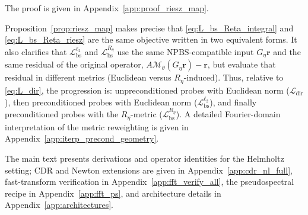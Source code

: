 \documentclass{article}
\theoremstyle{plain}
\theoremstyle{remark}
\newtheorem{remark}[proposition]{Remark}
\begin{document}
The proof is given in Appendix~\ref{app:proof_riesz_map}.

Proposition~\ref{prop:riesz_map} makes precise that \eqref{eq:L_bs_Reta_integral} and \eqref{eq:L_bs_Reta_riesz} are the same objective written in two equivalent forms. It also clarifies that $\mathcal{L}_{\mathrm{bs}}^{\ell_2}$ and $\mathcal{L}_{\mathrm{bs}}^{R_\eta}$ use the same NPBS-compatible input $G_\eta\bm r$ and the same residual of the original operator, $A\mathcal{M}_\theta(G_\eta\bm r)-\bm r$, but evaluate that residual in different metrics (Euclidean versus $R_\eta$-induced). Thus, relative to \eqref{eq:L_dir}, the progression is: unpreconditioned probes with Euclidean norm ($\mathcal{L}_{\mathrm{dir}}$), then preconditioned probes with Euclidean norm ($\mathcal{L}_{\mathrm{bs}}^{\ell_2}$), and finally preconditioned probes with the $R_\eta$-metric ($\mathcal{L}_{\mathrm{bs}}^{R_\eta}$). A detailed Fourier-domain interpretation of the metric reweighting is given in Appendix~\ref{app:iterp_precond_geometry}.




The main text presents derivations and operator identities for the Helmholtz setting; CDR and Newton extensions are given in Appendix~\ref{app:cdr_nl_full}, fast-transform verification in Appendix~\ref{app:fft_verify_all}, the pseudospectral recipe in Appendix~\ref{app:fft_ps}, and architecture details in Appendix~\ref{app:architectures}.
\end{document}
